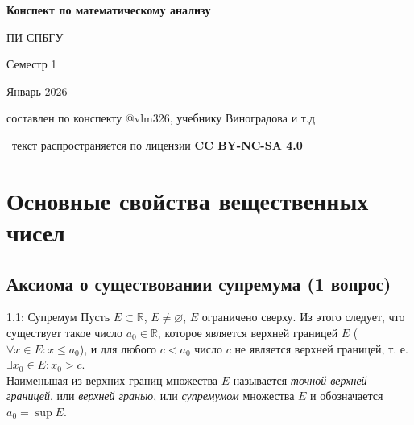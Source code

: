 \documentclass[a4paper,12pt]{article}
\begin{document}
	
	\begin{titlepage}
		\centering
		{\LARGE\bfseries Конспект по математическому анализу\par}
		\vspace{0.5cm}
		{\Large ПИ СПБГУ\par}
		\vspace{0.3cm}
		{\Large Семестр 1\par}
		
		\vspace{2cm}
		
		{\large Январь 2026\par}
		
		\vfill
		
		{\footnotesize составлен по конспекту @vlm326, учебнику Виноградова и т.д\par}
		
		\vspace{0.3cm}
		
		{\footnotesize \textcopyright\ текст распространяется по лицензии \textbf{CC BY-NC-SA 4.0} \par}
	\end{titlepage}
	
	\newpage
	\tableofcontents
	
	
	
	
	
	
	
	\newpage
	\section{Основные свойства вещественных чисел}
	
	\subsection{Аксиома о существовании супремума (1 вопрос)}
	
	\begin{definitionbox}{1.1: Супремум}
		Пусть $E \subset \mathbb{R}$, $E \neq \varnothing$, $E$ ограничено сверху. Из этого следует, что существует такое число $a_0 \in \mathbb{R}$, которое является верхней границей $E$ ($\forall x \in E \colon x \le a_0$), и для любого $c < a_0$ число $c$ не является верхней границей, т. е. $\exists x_0 \in E \colon x_0 > c$.\\
		
		Наименьшая из верхних границ множества $E$ называется \textit{точной верхней границей}, или \textit{верхней гранью}, или \textit{супремумом} множества $E$ и обозначается $a_0 = \sup E$.
	\end{definitionbox}
	
\end{document}
